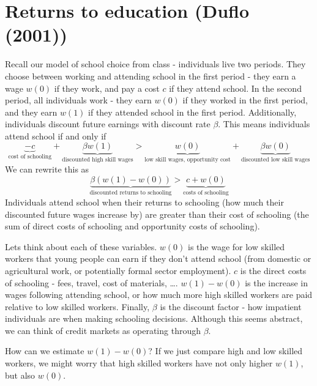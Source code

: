 \documentclass[12pt,english]{article}
\begin{document}
\section{Returns to education (Duflo (2001))}

Recall our model of school choice from class - individuals live two periods. They choose between working and attending school in the first period - they earn a wage $w(0)$ if they work, and pay a cost $c$ if they attend school. In the second period, all individuals work - they earn $w(0)$ if they worked in the first period, and they earn $w(1)$ if they attended school in the first period. Additionally, individuals discount future earnings with discount rate $\beta$. This means individuals attend school if and only if
$$ \underbrace{-c}_{\text{cost of schooling}} + \underbrace{\beta w(1)}_{\text{discounted high skill wages}} > \underbrace{w(0)}_{\text{low skill wages, opportunity cost}} + \underbrace{\beta w(0)}_{\text{discounted low skill wages}} $$
We can rewrite this as
$$ \underbrace{\beta (w(1) - w(0))}_{\text{discounted returns to schooling}} > \underbrace{c + w(0)}_{\text{costs of schooling}} $$
Individuals attend school when their returns to schooling (how much their discounted future wages increase by) are greater than their cost of schooling (the sum of direct costs of schooling and opportunity costs of schooling).

Lets think about each of these variables. $w(0)$ is the wage for low skilled workers that young people can earn if they don't attend school (from domestic or agricultural work, or potentially formal sector employment). $c$ is the direct costs of schooling - fees, travel, cost of materials, \ldots. $w(1) - w(0)$ is the increase in wages following attending school, or how much more high skilled workers are paid relative to low skilled workers. Finally, $\beta$ is the discount factor - how impatient individuals are when making schooling decisions. Although this seems abstract, we can think of credit markets as operating through $\beta$.

How can we estimate $w(1) - w(0)$? If we just compare high and low skilled workers, we might worry that high skilled workers have not only higher $w(1)$, but also $w(0)$.
\end{document}
